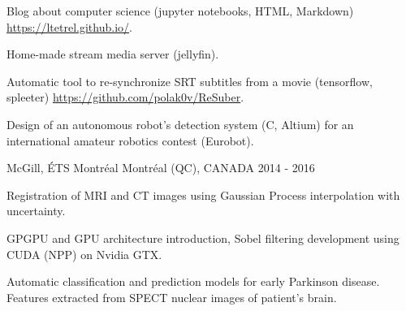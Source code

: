


\begin{cventries}


\cventry
{} %
{} %
{} %
{} %
{ %
\vspace{-5mm}
\begin{cvitems}
\item {Blog about computer science (jupyter notebooks, HTML, Markdown) \url{https://ltetrel.github.io/}.}
\item {Home-made stream media server (jellyfin).}
\item {Automatic tool to re-synchronize SRT subtitles from a movie (tensorflow, spleeter)  \url{https://github.com/polak0v/ReSuber}.}
\item{Design of an autonomous robot's detection system (C, Altium) for an international amateur robotics contest (Eurobot).}
\end{cvitems}
}


\cventry
{} %
{McGill, ÉTS Montréal} %
{\hspace{-5mm}Montréal (QC), CANADA} %
{2014 - 2016} %
{ %
\vspace{-5mm}
\begin{cvitems}
\item {Registration of MRI and CT images using Gaussian Process interpolation with uncertainty.}
\item {GPGPU and GPU architecture introduction, Sobel filtering development using CUDA (NPP) on Nvidia GTX.}
\item {Automatic classification and prediction models for early Parkinson disease. Features extracted from SPECT nuclear images of patient's brain.}
\end{cvitems}
}


\end{cventries}
